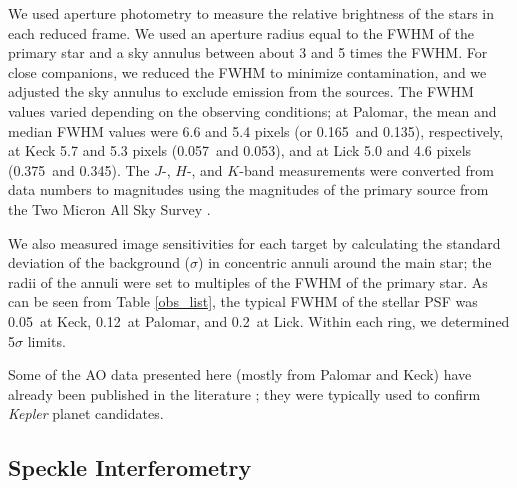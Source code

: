 \documentclass[twocolumn,appendixfloats]{aastex6}
\begin{document}
We used aperture photometry to measure the relative brightness of the stars
in each reduced frame. We used an aperture radius equal to the FWHM of
the primary star and a sky annulus between about 3 and 5 times the FWHM.
For close companions, we reduced the FWHM to minimize contamination,
and we adjusted the sky annulus to exclude emission from the sources.
The FWHM values varied depending on the observing conditions; at
Palomar, the mean and median FWHM values were 6.6 and 5.4 pixels
(or 0.165\arcsec\ and 0.135\arcsec), respectively, at Keck 5.7 and 5.3 pixels
(0.057\arcsec\ and 0.053\arcsec), and at Lick 5.0 and 4.6 pixels (0.375\arcsec\
and 0.345\arcsec).  
The $J$-, $H$-, and $K$-band measurements were converted from data
numbers to magnitudes using the magnitudes of the primary source from
the Two Micron All Sky Survey \citep[2MASS;][]{skrutskie06}. 

We also measured image sensitivities for each target by calculating the standard 
deviation of the background ($\sigma$) in concentric annuli around the main star; 
the radii of the annuli were set to multiples of the FWHM of the primary star.  
As can be seen from Table \ref{obs_list}, the typical FWHM of the stellar PSF 
was 0.05\arcsec\ at Keck, 0.12\arcsec\ at Palomar, and 0.2\arcsec\ at Lick. 
Within each ring, we determined 5$\sigma$ limits.

Some of the AO data presented here (mostly from Palomar and Keck) have 
already been published in the literature \citep{torres11, batalha11, fortney11, 
ballard11, ballard13, borucki12, borucki13, gautier12, adams12, marcy14, 
everett15, torres15, teske15}; they were typically used to confirm {\it Kepler} 
planet candidates.


\subsection{Speckle Interferometry}
\label{our_speckle}
\end{document}
